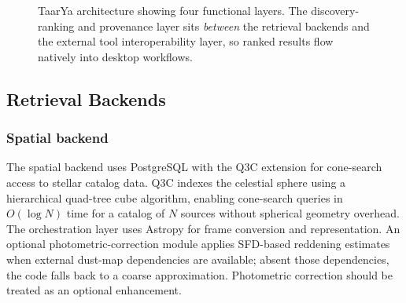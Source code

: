 \documentclass[12pt]{elsarticle}
\begin{document}
\begin{figure}[htbp]
\caption{\label{fig:architecture}\textsf{TaarYa} architecture showing four functional layers. The discovery-ranking and provenance layer sits \emph{between} the retrieval backends and the external tool interoperability layer, so ranked results flow natively into desktop workflows.}
\end{figure}

\subsection{Retrieval Backends}
\label{sec:retrieval}

\subsubsection{Spatial backend}
The spatial backend uses PostgreSQL with the Q3C extension \citep{Koposov2006} for cone-search access to stellar catalog data. Q3C indexes the celestial sphere using a hierarchical quad-tree cube algorithm, enabling cone-search queries in $O(\log N)$ time for a catalog of $N$ sources without spherical geometry overhead. The orchestration layer uses \textsf{Astropy} \citep{AstropyCollaboration2022} for frame conversion and representation. An optional photometric-correction module applies SFD-based reddening estimates \citep{Schlegel1998} when external dust-map dependencies are available; absent those dependencies, the code falls back to a coarse approximation. Photometric correction should be treated as an optional enhancement.
\end{document}

